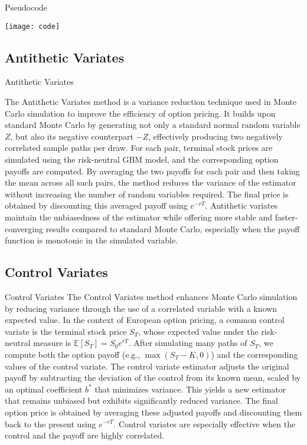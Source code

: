 \documentclass[aspectratio=169,xcolor=dvipsnames]{beamer}
\begin{document}
\begin{frame}{Pseudocode}
	\begin{center}
	\texttt{[image: code]}
\end{center}
\end{frame}
	
	
	\subsection{Antithetic Variates}
	\begin{frame}{Antithetic Variates}
		 
		The Antithetic Variates method is a variance reduction technique used in Monte Carlo simulation to improve the efficiency of option pricing. It builds upon standard Monte Carlo by generating not only a standard normal random variable \( Z \), but also its negative counterpart \( -Z \), effectively producing two negatively correlated sample paths per draw. For each pair, terminal stock prices are simulated using the risk-neutral GBM model, and the corresponding option payoffs are computed. By averaging the two payoffs for each pair and then taking the mean across all such pairs, the method reduces the variance of the estimator without increasing the number of random variables required. The final price is obtained by discounting this averaged payoff using \( e^{-rT} \). Antithetic variates maintain the unbiasedness of the estimator while offering more stable and faster-converging results compared to standard Monte Carlo, especially when the payoff function is monotonic in the simulated variable.
	
	\end{frame}
	
	 \subsection{Control Variates}
	 
	 \begin{frame}{Control Variates}
	The Control Variates method enhances Monte Carlo simulation by reducing variance through the use of a correlated variable with a known expected value. In the context of European option pricing, a common control variate is the terminal stock price \( S_T \), whose expected value under the risk-neutral measure is \( \mathbb{E}[S_T] = S_0 e^{rT} \). After simulating many paths of \( S_T \), we compute both the option payoff (e.g., \( \max(S_T - K, 0) \)) and the corresponding values of the control variate. The control variate estimator adjusts the original payoff by subtracting the deviation of the control from its known mean, scaled by an optimal coefficient \( b^* \) that minimizes variance. This yields a new estimator that remains unbiased but exhibits significantly reduced variance. The final option price is obtained by averaging these adjusted payoffs and discounting them back to the present using \( e^{-rT} \). Control variates are especially effective when the control and the payoff are highly correlated.
	\end{frame}
	
\end{document}
